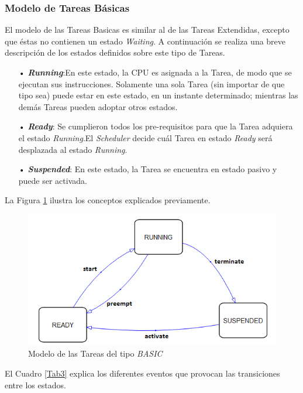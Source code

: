 \documentclass[12pt,letterpaper]{article}
\begin{document}
\begin{enumerate}
\subsubsection{Modelo de Tareas Básicas}
El modelo de las Tareas Basicas es similar al de las Tareas Extendidas, excepto que éstas no contienen un estado \textit{Waiting}. A continuación se realiza una breve descripción de los estados definidos sobre este tipo de Tareas.
\begin{enumerate}
\item[•]\textbf{\emph{Running}}:En este estado, la CPU es asignada a la Tarea, de modo que se ejecutan sus instrucciones. Solamente una sola Tarea (sin importar de que tipo sea) puede estar en este estado, en un instante determinado; mientras las demás Tareas pueden adoptar otros estados.
\item[•]\textbf{\emph{Ready}}: Se cumplieron todos los pre-requisitos para que la Tarea adquiera el estado \textit{Running}.El \textit{Scheduler} decide cuál Tarea en estado \textit{Ready} será desplazada al estado \textit{Running}.
\item[•]\textbf{\emph{Suspended}}: En este estado, la Tarea se encuentra en estado pasivo y puede ser activada.
\end{enumerate}
La Figura \ref{Fig32} ilustra los conceptos explicados previamente.
\begin{center}
\begin{figure}[!h]
\centering
\includegraphics[width=8 cm]{figuras/f14.png}
\caption{Modelo de las Tareas del tipo \textit{BASIC}}
\label{Fig32}
\end{figure}
\end{center}
\end{enumerate}

El Cuadro \ref{Tab3} explica los diferentes eventos que provocan las transiciones entre los estados. 
\end{document}
